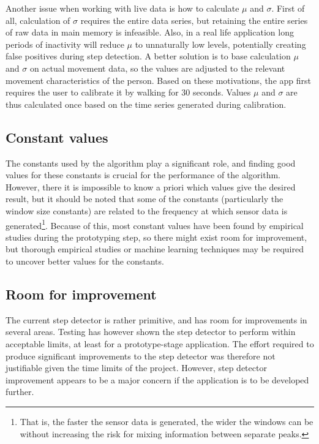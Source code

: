 Another issue when working with live data is how to calculate $\mu$ and $\sigma$. First of all, calculation of $\sigma$ requires the entire data series, but retaining the entire series of raw data in main memory is infeasible. Also, in a real life application long periods of inactivity will reduce $\mu$ to unnaturally low levels, potentially creating false positives during step detection. A better solution is to base calculation $\mu$ and $\sigma$ on actual movement data, so the values are adjusted to the relevant movement characteristics of the person. Based on these motivations, the app first requires the user to calibrate it by walking for 30 seconds. Values $\mu$ and $\sigma$ are thus calculated once based on the time series generated during calibration. 

\subsection{Constant values}
\label{constant_values}
The constants used by the algorithm play a significant role, and finding good values for these constants is crucial for the performance of the algorithm. However, there it is impossible to know a priori which values give the desired result, but it should be noted that some of the constants (particularly the window size constants) are related to the frequency at which sensor data is generated\footnote{That is, the faster the sensor data is generated, the wider the windows can be without increasing the risk for mixing information between separate peaks.}. Because of this, most constant values have been found by empirical studies during the prototyping step, so there might exist room for improvement, but thorough empirical studies or machine learning techniques may be required to uncover better values for the constants.

\subsection{Room for improvement}
\label{step_detector_improvements}
The current step detector is rather primitive, and has room for improvements in several areas. Testing has however shown the step detector to perform within acceptable limits, at least for a prototype-stage application. The effort required to produce significant improvements to the step detector was therefore not justifiable given the time limits of the project. However, step detector improvement appears to be a major concern if the application is to be developed further.

